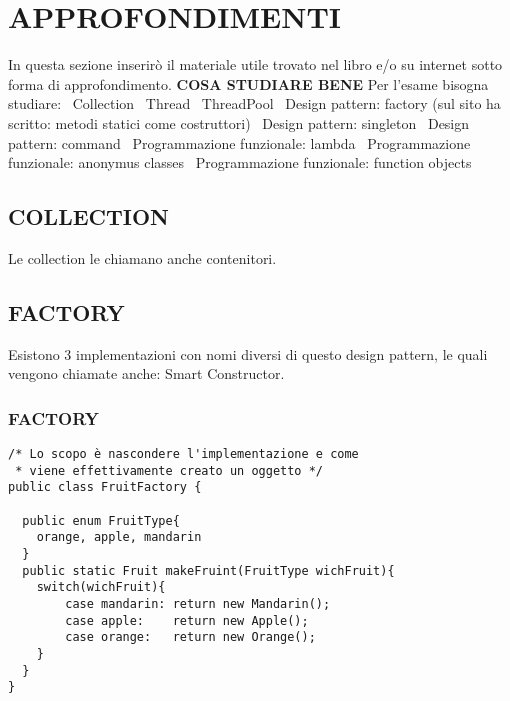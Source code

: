 

\newpage
{}
\section{APPROFONDIMENTI}
In questa sezione inserirò il materiale utile trovato nel libro e/o su internet sotto forma di approfondimento. \newline
\noindent \textbf{COSA STUDIARE BENE} \newline
Per l'esame bisogna studiare: \newline
\textbullet\ Collection \newline
\textbullet\ Thread \newline
\textbullet\ ThreadPool \newline
\textbullet\ Design pattern: factory (sul sito ha scritto: metodi statici come costruttori)\newline
\textbullet\ Design pattern: singleton \newline
\textbullet\ Design pattern: command \newline
\textbullet\ Programmazione funzionale: lambda \newline
\textbullet\ Programmazione funzionale: anonymus classes \newline
\textbullet\ Programmazione funzionale: function objects \newline

\subsection{COLLECTION}
\noindent Le collection le chiamano anche contenitori.

\subsection{FACTORY}
Esistono 3 implementazioni con nomi diversi di questo design pattern, le quali vengono chiamate anche: Smart Constructor. \newline
\subsubsection{FACTORY}
\begin{lstlisting}
/* Lo scopo è nascondere l'implementazione e come
 * viene effettivamente creato un oggetto */
public class FruitFactory {

  public enum FruitType{
  	orange, apple, mandarin
  }
  public static Fruit makeFruint(FruitType wichFruit){
  	switch(wichFruit){
  		case mandarin: return new Mandarin();
  		case apple:    return new Apple();
  		case orange:   return new Orange();
  	}
  }
}
\end{lstlisting}

